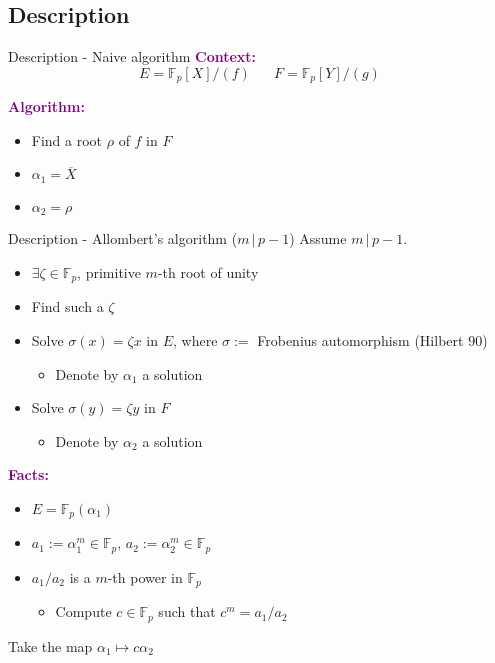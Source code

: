 \documentclass[xcolor=x11names,compress]{beamer}
\theoremstyle{break}
\theoremstyle{sc}
\theoremstyle{definition}
\theoremstyle{remark}
\begin{document}
\subsection{Description}
\begin{frame}{Description - Naive algorithm}
  \textcolor{purple}{\textbf{Context:}}
  \[
    E = \mathbb{F}_p[X]/(f)\phantom{and}F=\mathbb{F}_p[Y]/(g)
  \]
  
  \textcolor{purple}{\textbf{Algorithm:}}
  \begin{itemize}
    \item Find a root $\rho$ of $f$ in $F$
    \item $\alpha_1 = \overline X$
    \item $\alpha_2 = \rho$
  \end{itemize}
\end{frame}
\begin{frame}{Description - Allombert's algorithm ($m\,|\,p-1$)}
Assume $m\,|\,p-1$.
  \begin{itemize}
    \item $\exists \zeta\in\mathbb{F}_p$, primitive $m$-th root of unity
    \item Find such a $\zeta$
    \item Solve $\sigma(x) = \zeta x$ in $E$, where $\sigma:=$
      Frobenius automorphism (Hilbert 90)
      \begin{itemize}
        \item Denote by $\alpha_1$ a solution
      \end{itemize}
    \item Solve $\sigma(y) = \zeta y$ in $F$
      \begin{itemize}
        \item Denote by $\alpha_2$ a solution
      \end{itemize}
  \end{itemize}
  \textcolor{purple}{\textbf{Facts:}}
  \begin{itemize}
    \item $E=\mathbb{F}_p(\alpha_1)$%
  \item $a_1:=\alpha_1^m\in\mathbb{F}_p$, $a_2:=\alpha_2^m\in\mathbb{F}_p$
    \item $a_1/a_2$ is a $m$-th power in $\mathbb{F}_p$
      \begin{itemize}
        \item Compute $c\in\mathbb{F}_p$ such that $c^m=a_1/a_2$
      \end{itemize}
  \end{itemize}
  Take the map $\alpha_1\mapsto c\alpha_2$
\end{frame}
\end{document}

